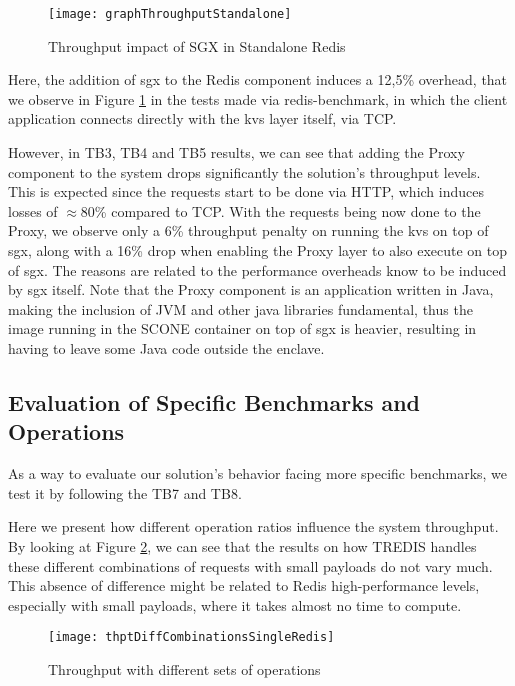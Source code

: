 \begin{figure}[htbp]
	\centering
	{\texttt{[image: graphThroughputStandalone]}}
	\caption{Throughput impact of SGX in Standalone Redis}
	\label{fig:graphThroughputStandalone}
\end{figure}

Here, the addition of \gls{sgx} to the Redis component induces a 12,5\% overhead, that we observe in Figure \ref{fig:graphThroughputStandalone} in the tests made via redis-benchmark, in which the client application connects directly with the \gls{kvs} layer itself, via TCP. 

However, in TB3, TB4 and TB5 results, we can see that adding the Proxy component to the system drops significantly the solution's throughput levels. This is expected since the requests start to be done via HTTP, which induces losses of $\approx$80\% compared to TCP. With the requests being now done to the Proxy, we observe only a 6\% throughput penalty on running the \gls{kvs} on top of \gls{sgx}, along with a 16\% drop when enabling the Proxy layer to also execute on top of \gls{sgx}. The reasons are related to the performance overheads know to be induced by \gls{sgx} itself. Note that the Proxy component is an application written in Java, making the inclusion of JVM and other java libraries fundamental, thus the image running in the SCONE container on top of \gls{sgx} is heavier, resulting in having to leave some Java code outside the enclave.


\subsection{Evaluation of Specific Benchmarks and Operations}
\label{ssec:specificBenchmarksRedisS}

As a way to evaluate our solution's behavior facing more specific benchmarks, we test it by following the TB7 and TB8. 

Here we present how different operation ratios influence the system throughput. By looking at Figure \ref{fig:thptDiffCombinationsSingleRedis}, we can see that the results on how TREDIS handles these different combinations of requests with small payloads do not vary much. This absence of difference might be related to Redis high-performance levels, especially with small payloads, where it takes almost no time to compute.

\begin{figure}[htbp]
	\centering
	{\texttt{[image: thptDiffCombinationsSingleRedis]}}
	\caption{Throughput with different sets of operations}
	\label{fig:thptDiffCombinationsSingleRedis}
\end{figure}

